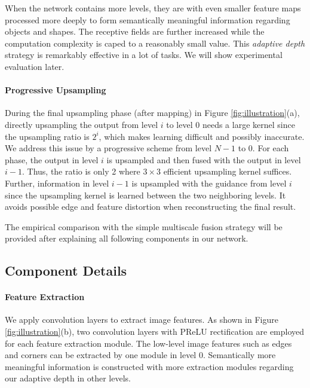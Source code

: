 \documentclass[10pt,twocolumn,letterpaper]{article}
\begin{document}
When the network contains more levels, they are with even smaller feature maps processed more
deeply to form semantically meaningful information regarding objects and shapes. The
receptive fields are further increased while the computation complexity is caped to a
reasonably small value. This {\it adaptive depth} strategy is remarkably effective in a
lot of tasks. We will show experimental evaluation later.

\vspace{-0.15in}\paragraph{Progressive Upsampling}

During the final upsampling phase (after mapping) in Figure \ref{fig:illustration}(a),
directly upsampling the output from level $i$ to level $0$ needs a large kernel since the
upsampling ratio is $2^i$, which makes learning difficult and possibly inaccurate. We
address this issue by a progressive scheme from level $N-1$ to $0$. For each phase, the
output in level $i$ is upsampled and then fused with the output in level $i-1$. Thus, the
ratio is only 2 where $3\times3$ efficient upsampling kernel suffices. Further,
information in level $i-1$ is upsampled with the guidance from level $i$ since the
upsampling kernel is learned between the two neighboring levels. It avoids possible edge
and feature distortion when reconstructing the final result.

The empirical comparison with the simple multiscale fusion strategy will be provided
after explaining all following components in our network.


\subsection{Component Details}

\paragraph{Feature Extraction} We apply convolution layers to extract
image features. As shown in Figure \ref{fig:illustration}(b), two convolution layers with
PReLU rectification are employed for each feature extraction module. The low-level image
features such as edges and corners can be extracted by one module \cite{ZeilerF14} in
level 0. Semantically more meaningful information is constructed with more extraction
modules regarding our adaptive depth in other levels.
\end{document}

